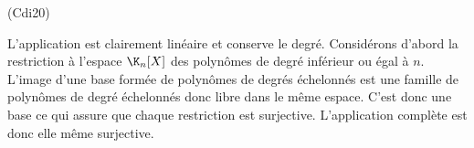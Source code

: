 \begin{tiny}(Cdi20)\end{tiny} L'application est clairement linéaire et conserve le degré. Considérons d'abord la restriction à l'espace $\K_n[X]$ des polynômes de degré inférieur ou égal à $n$. L'image d'une base formée de polynômes de degrés échelonnés est une famille de polynômes de degré échelonnés donc libre dans le même espace. C'est donc une base ce qui assure que chaque restriction est surjective. L'application complète est donc elle même surjective.